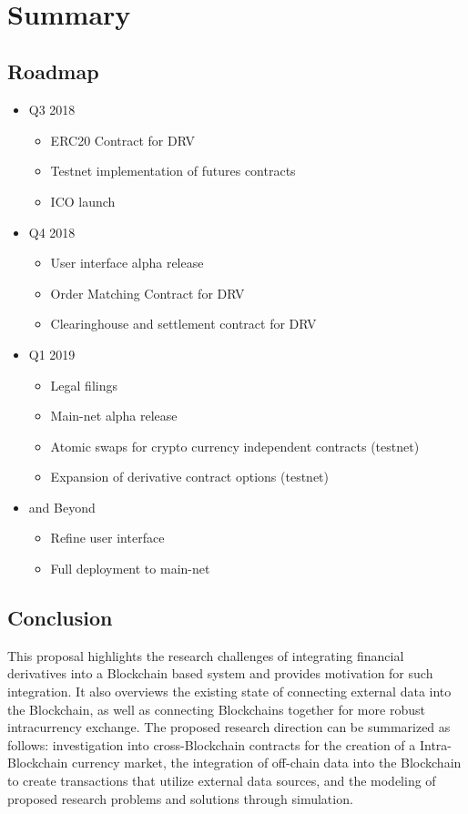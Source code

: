 \pagebreak

\

\section{Summary}
\subsection{Roadmap}

\begin{itemize}
  \item Q3 2018
    \begin{itemize}
      \item ERC20 Contract for DRV
      \item Testnet implementation of futures contracts
      \item ICO launch
    \end{itemize}
  \item Q4 2018
    \begin{itemize}
      \item User interface alpha release
      \item Order Matching Contract for DRV
      \item Clearinghouse and settlement contract for DRV
    \end{itemize}
  \item Q1 2019
    \begin{itemize}
      \item Legal filings
      \item Main-net alpha release
      \item Atomic swaps for crypto currency independent contracts (testnet)
      \item Expansion of derivative contract options (testnet)
    \end{itemize}
  \item and Beyond
    \begin{itemize}
      \item Refine user interface
      \item Full deployment to main-net
    \end{itemize}
\end{itemize}

\fi

\subsection{Conclusion}
This proposal highlights the research challenges of integrating financial derivatives into a Blockchain based system and provides motivation for such integration.
It also overviews the existing state of connecting external data into the Blockchain, as well as connecting Blockchains together for more robust intracurrency exchange.
The proposed research direction can be summarized as follows: investigation into cross-Blockchain contracts for the creation of a Intra-Blockchain currency market, the integration of off-chain data into the Blockchain to create transactions that utilize external data sources, and the modeling of proposed research problems and solutions through simulation.


\pagebreak
